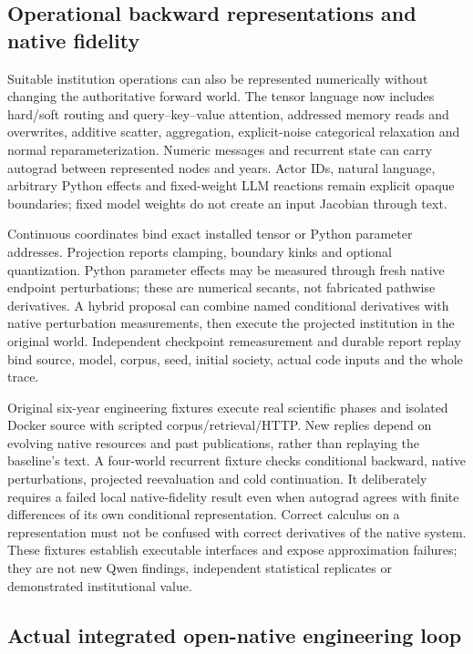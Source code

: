 \subsection{Operational backward representations and native fidelity}
\label{sec:operational-native-v7}

Suitable institution operations can also be represented numerically without
changing the authoritative forward world. The tensor language now includes
hard/soft routing and query--key--value attention, addressed memory reads and
overwrites, additive scatter, aggregation, explicit-noise categorical relaxation
and normal reparameterization. Numeric messages and recurrent state can carry
autograd between represented nodes and years. Actor IDs, natural language,
arbitrary Python effects and fixed-weight LLM reactions remain explicit opaque
boundaries; fixed model weights do not create an input Jacobian through text.

Continuous coordinates bind exact installed tensor or Python parameter addresses.
Projection reports clamping, boundary kinks and optional quantization. Python
parameter effects may be measured through fresh native endpoint perturbations;
these are numerical secants, not fabricated pathwise derivatives. A hybrid
proposal can combine named conditional derivatives with native perturbation
measurements, then execute the projected institution in the original world.
Independent checkpoint remeasurement and durable report replay bind source,
model, corpus, seed, initial society, actual code inputs and the whole trace.

Original six-year engineering fixtures execute real scientific phases and
isolated Docker source with scripted corpus/retrieval/HTTP. New replies depend
on evolving native resources and past publications, rather than replaying the
baseline's text. A four-world recurrent fixture checks conditional backward,
native perturbations, projected reevaluation and cold continuation. It
deliberately requires a failed local native-fidelity result even when autograd
agrees with finite differences of its own conditional representation. Correct
calculus on a representation must not be confused with correct derivatives of
the native system. These fixtures establish executable interfaces and expose
approximation failures; they are not new Qwen findings, independent statistical
replicates or demonstrated institutional value.

\subsection{Actual integrated open-native engineering loop}
\label{sec:integrated-open-native-v7}

